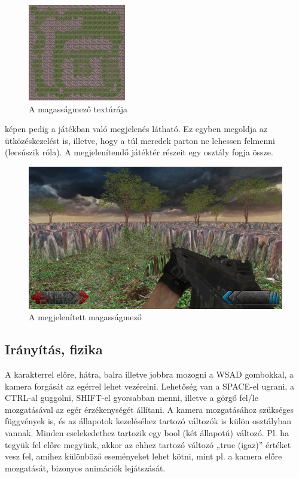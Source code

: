 \begin{figure}[h]
\centering
\includegraphics[scale=1.6]{kepek/heightmap_texture.png}
\caption{A magasságmező textúrája}
\label{fig:heightmap_texture}
\end{figure}

 képen pedig a játékban való megjelenés látható. Ez egyben megoldja az ütközéskezelést is, illetve, hogy a túl meredek parton ne lehessen felmenni (lecsúszik róla). A megjelenítendő játéktér részeit egy osztály fogja össze.

\begin{figure}[h]
\centering
\includegraphics[scale=0.4]{kepek/screenshot.png}
\caption{A megjelenített magasságmező}
\label{fig:screenshot}
\end{figure}

\subsection{Irányítás, fizika}

A karakterrel előre, hátra, balra illetve jobbra mozogni a WSAD gombokkal, a kamera forgását az egérrel lehet vezérelni. Lehetőség van a SPACE-el ugrani, a CTRL-al guggolni, SHIFT-el gyorsabban menni, illetve a görgő fel/le mozgatásával az egér érzékenységét állítani. A kamera mozgatásához szükséges függvények is, és az állapotok kezeléséhez tartozó változók is külön osztályban vannak. Minden cselekedethez tartozik egy bool (két állapotú) változó. Pl. ha tegyük fel előre megyünk, akkor az ehhez tartozó változó „true (igaz)” értéket vesz fel, amihez különböző eseményeket lehet kötni, mint pl. a kamera előre mozgatását, bizonyos animációk lejátszását.


